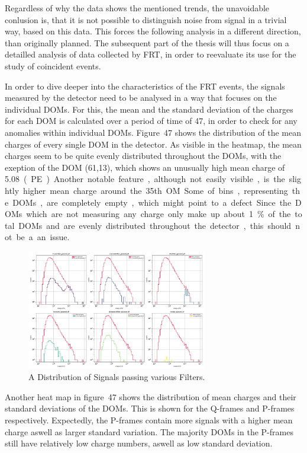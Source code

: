 Regardless of why the data shows the mentioned trends, the unavoidable conlusion is, that it is not possible to distinguish noise from signal in a trivial way, based 
on this data. This forces the following analysis in a different direction, than originally planned. The subsequent part of the thesis will thus focus on a detailled 
analysis of data collected by FRT, in order to reevaluate its use for the study of coincident events. 

In order to dive deeper into the characteristics of the FRT events, the signals measured by the detector need to be analysed in a way that focuses on the individual 
DOMs. For this, the mean and the standard deviation of the charges for each DOM is calculated over a period of time of \num{47}, in order to check for any anomalies
within individual DOMs. Figure~47 shows the distribution of the mean charges of every single DOM in the detector. As visible in the heatmap, the mean charges seem to 
be quite evenly distributed throughout the DOMs, with the exeption of the DOM (61,13), which shows an unusually high mean charge of \num{5.08}~\unit(PE). Another 
notable feature, although not easily visible, is the slightly higher mean charge around the 35th OM. Some of bins, representing the DOMs, are completely empty, which 
might point to a defect. Since the DOMs which are not measuring any charge only make up about \SI{1}{\percent} of the total DOMs and are evenly distributed throughout
the detector, this should not be a an issue. 

\begin{figure}
    \centering
    \includegraphics[width=0.7\textwidth]{Plots/selected_filters_subplot.pdf}
    \caption{A Distribution of Signals passing various Filters.}
\end{figure}

Another heat map in figure~47 shows the distribution of mean charges and their standard deviations of the DOMs. This is shown for the Q-frames and P-frames 
respectively. Expectedly, the P-frames contain more signals with a higher mean charge aswell as larger standard variation. The majority DOMs in the P-frames still have 
relatively low charge numbers, aswell as low standard deviation. 

